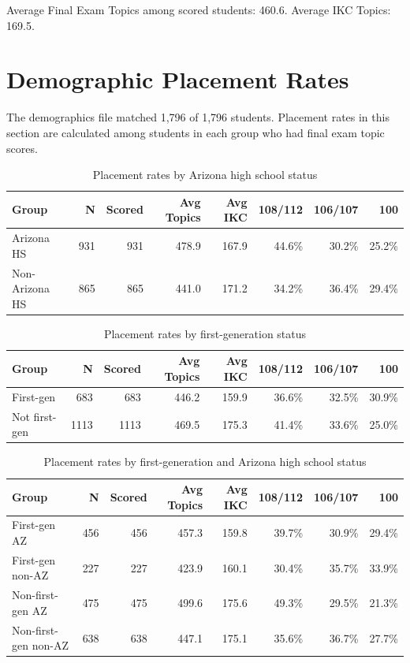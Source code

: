 \documentclass[11pt]{article}
\begin{document}
Average Final Exam Topics among scored students: 460.6. Average IKC Topics: 169.5.

\clearpage

\section*{Demographic Placement Rates}

The demographics file matched 1,796 of 1,796 students. Placement rates in this section are calculated among students in each group who had final exam topic scores.

\begin{table}[htbp]
\centering
\small
\caption{Placement rates by Arizona high school status}
\begin{tabular}{lrrrrrrr}
\hline
Group & N & Scored & Avg Topics & Avg IKC & 108/112 & 106/107 & 100 \\
\hline
Arizona HS & 931 & 931 & 478.9 & 167.9 & 44.6\% & 30.2\% & 25.2\% \\
Non-Arizona HS & 865 & 865 & 441.0 & 171.2 & 34.2\% & 36.4\% & 29.4\% \\
\hline
\end{tabular}
\end{table}

\begin{table}[htbp]
\centering
\small
\caption{Placement rates by first-generation status}
\begin{tabular}{lrrrrrrr}
\hline
Group & N & Scored & Avg Topics & Avg IKC & 108/112 & 106/107 & 100 \\
\hline
First-gen & 683 & 683 & 446.2 & 159.9 & 36.6\% & 32.5\% & 30.9\% \\
Not first-gen & 1113 & 1113 & 469.5 & 175.3 & 41.4\% & 33.6\% & 25.0\% \\
\hline
\end{tabular}
\end{table}

\begin{table}[htbp]
\centering
\small
\caption{Placement rates by first-generation and Arizona high school status}
\begin{tabular}{lrrrrrrr}
\hline
Group & N & Scored & Avg Topics & Avg IKC & 108/112 & 106/107 & 100 \\
\hline
First-gen AZ & 456 & 456 & 457.3 & 159.8 & 39.7\% & 30.9\% & 29.4\% \\
First-gen non-AZ & 227 & 227 & 423.9 & 160.1 & 30.4\% & 35.7\% & 33.9\% \\
Non-first-gen AZ & 475 & 475 & 499.6 & 175.6 & 49.3\% & 29.5\% & 21.3\% \\
Non-first-gen non-AZ & 638 & 638 & 447.1 & 175.1 & 35.6\% & 36.7\% & 27.7\% \\
\hline
\end{tabular}
\end{table}
\end{document}
